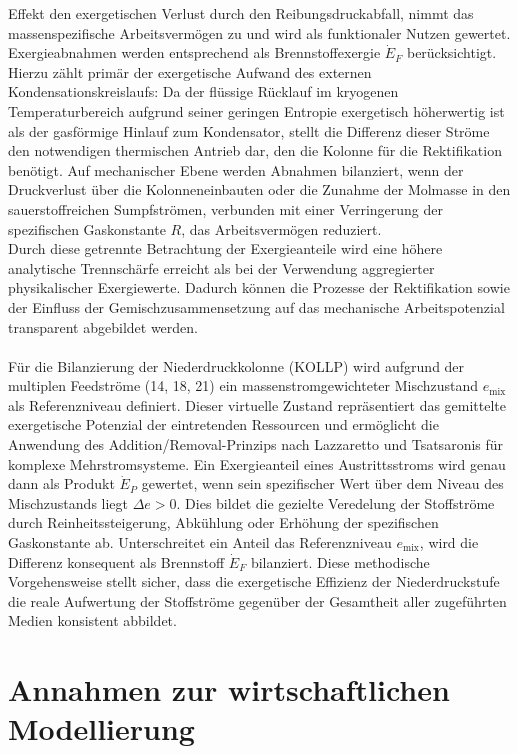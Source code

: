 Effekt den exergetischen Verlust durch den Reibungsdruckabfall, nimmt das massenspezifische Arbeitsvermögen zu und wird als funktionaler Nutzen
gewertet.\\
Exergieabnahmen werden entsprechend als Brennstoffexergie \(\dot{E}_F\) berücksichtigt. Hierzu zählt primär der exergetische Aufwand des externen Kondensationskreislaufs: Da der flüssige Rücklauf im kryogenen Temperaturbereich aufgrund seiner geringen Entropie exergetisch höherwertig ist als der gasförmige Hinlauf zum Kondensator, stellt die Differenz dieser Ströme den notwendigen thermischen Antrieb dar, den die Kolonne für die Rektifikation benötigt. Auf mechanischer Ebene werden Abnahmen bilanziert, wenn der Druckverlust über die Kolonneneinbauten oder die Zunahme der Molmasse in den sauerstoffreichen Sumpfströmen, verbunden mit einer Verringerung der spezifischen Gaskonstante \(R\), das Arbeitsvermögen reduziert.\\
Durch diese getrennte Betrachtung der Exergieanteile wird eine höhere analytische Trennschärfe erreicht als bei der Verwendung aggregierter physikalischer Exergiewerte. Dadurch können die Prozesse der Rektifikation sowie der Einfluss der Gemischzusammensetzung auf das mechanische Arbeitspotenzial transparent abgebildet werden.\\
\\
Für die Bilanzierung der Niederdruckkolonne (KOLLP) wird aufgrund der multiplen Feedströme (14, 18, 21) ein massenstromgewichteter Mischzustand \(e_\mathrm{mix}\) als Referenzniveau definiert. Dieser virtuelle Zustand repräsentiert das gemittelte exergetische Potenzial der eintretenden Ressourcen und ermöglicht die Anwendung des Addition/Removal-Prinzips nach Lazzaretto und Tsatsaronis für komplexe Mehrstromsysteme. Ein Exergieanteil eines Austrittsstroms wird genau dann als Produkt \(\dot{E}_P\) gewertet, wenn sein spezifischer Wert über dem Niveau des Mischzustands liegt \(\Delta e > 0\). Dies bildet die gezielte Veredelung der Stoffströme durch Reinheitssteigerung, Abkühlung oder Erhöhung der spezifischen Gaskonstante ab. Unterschreitet ein Anteil das Referenzniveau \(e_\mathrm{mix}\), wird die Differenz konsequent als Brennstoff \(\dot{E}_F\) bilanziert. Diese methodische Vorgehensweise stellt sicher, dass die exergetische Effizienz der Niederdruckstufe die reale Aufwertung der Stoffströme gegenüber der Gesamtheit aller zugeführten Medien konsistent abbildet.

\section{Annahmen zur wirtschaftlichen Modellierung}
\label{sec:modell_economics}

